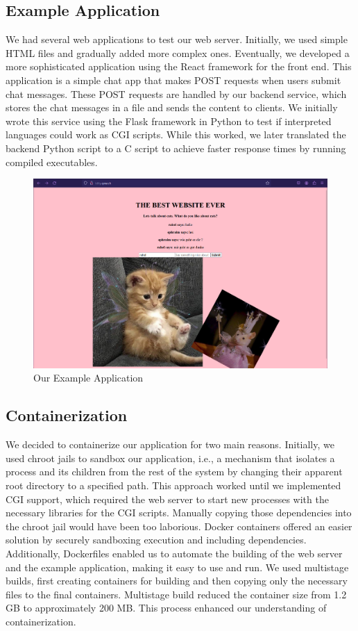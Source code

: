 \subsection*{Example Application}
We had several web applications to test our web server. Initially, we used simple HTML files and gradually added more complex ones. Eventually, we developed a more sophisticated application using the React framework for the front end. This application is a simple chat app that makes POST requests when users submit chat messages. These POST requests are handled by our backend service, which stores the chat messages in a file and sends the content to clients. We initially wrote this service using the Flask framework in Python to test if interpreted languages could work as CGI scripts. While this worked, we later translated the backend Python script to a C script to achieve faster response times by running compiled executables. 

\begin{figure}[h]
	\centering
	\includegraphics[width=\textwidth]{figures/screenshot_ex_app.png}
    \caption{Our Example Application}
\end{figure}

\subsection*{Containerization}
We decided to containerize our application for two main reasons. Initially, we used chroot jails to sandbox our application, i.e., a mechanism that isolates a process and its children from the rest of the system by changing their apparent root directory to a specified path. This approach worked until we implemented CGI support, which required the web server to start new processes with the necessary libraries for the CGI scripts. Manually copying those dependencies into the chroot jail would have been too laborious. Docker containers offered an easier solution by securely sandboxing execution and including dependencies. Additionally, Dockerfiles enabled us to automate the building of the web server and the example application, making it easy to use and run. We used multistage builds, first creating containers for building and then copying only the necessary files to the final containers. Multistage build reduced the container size from 1.2 GB to approximately 200 MB. This process enhanced our understanding of containerization.
